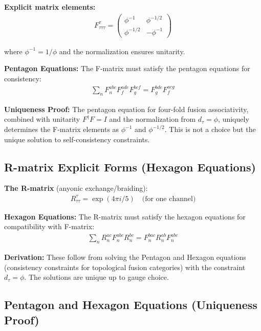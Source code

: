 \documentclass[11pt]{article}
\theoremstyle{definition}
\newcommand{\goldenratio}{\phi}
\begin{document}
\textbf{Explicit matrix elements:}
\begin{align}
F^\tau_{\tau\tau\tau} = \begin{pmatrix}
\goldenratio^{-1} & \goldenratio^{-1/2} \\
\goldenratio^{-1/2} & -\goldenratio^{-1}
\end{pmatrix}
\end{align}

where $\goldenratio^{-1} = 1/\goldenratio$ and the normalization ensures unitarity.

\textbf{Pentagon Equations:}
The F-matrix must satisfy the pentagon equations for consistency:
\begin{align}
\sum_n F^{abc}_n F^{ade}_f F^{bcf}_g = F^{bde}_g F^{acg}_f
\end{align}

\textbf{Uniqueness Proof:}
The pentagon equation for four-fold fusion associativity, combined with unitarity $F^\dagger F = I$ and the normalization from $d_\tau = \goldenratio$, uniquely determines the F-matrix elements as $\goldenratio^{-1}$ and $\goldenratio^{-1/2}$. This is not a choice but the unique solution to self-consistency constraints.

\subsection{R-matrix Explicit Forms (Hexagon Equations)}

\textbf{The R-matrix} (anyonic exchange/braiding):
\begin{align}
R^\tau_{\tau\tau} = \exp(4\pi i/5) \quad \text{(for one channel)}
\end{align}

\textbf{Hexagon Equations:}
The R-matrix must satisfy the hexagon equations for compatibility with F-matrix:
\begin{align}
\sum_n R^{ac}_n F^{abc}_n R^{bc}_n = F^{bac}_n R^{ab}_n F^{abc}_n
\end{align}

\textbf{Derivation:}
These follow from solving the Pentagon and Hexagon equations (consistency constraints for topological fusion categories) with the constraint $d_\tau = \goldenratio$. The solutions are unique up to gauge choice.

\subsection{Pentagon and Hexagon Equations (Uniqueness Proof)}
\end{document}
